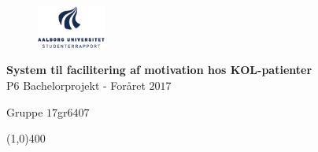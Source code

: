 \clearpage
\thispagestyle{empty}

\begin{figure}[H]
	\raggedleft
	\includegraphics[width=0.2\textwidth]{figures/aaulogo-da.png}
\end{figure} 

\vspace{5 cm}

\begin{center}	
	\begin{Huge}
		\textbf{System til facilitering af motivation hos KOL-patienter}\\
		\vspace{5 mm}
		P$6$ Bachelorprojekt - Foråret $2017$\\
		\vspace{3 mm}
	\end{Huge}
	{\Large Gruppe $17$gr$6407$}
\end{center}
\vspace*{\fill}

\begin{center}
	\line(1,0){400}
\end{center}

